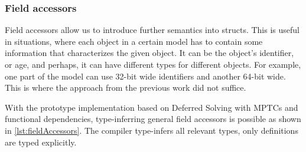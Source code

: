 \subsubsection{Field accessors}

Field accessors allow us to introduce further semantics into structs. This is useful in situations, where each object in a certain model has to contain some information that characterizes the given object. It can be the object's identifier, or age, and perhaps, it can have different types for different objects. For example, one part of the model can use 32-bit wide identifiers and another 64-bit wide. This is where the approach from the previous work did not suffice.

With the prototype implementation based on Deferred Solving with MPTCs and functional dependencies, type-inferring general field accessors is possible as shown in \cref{lst:fieldAccessors}. The compiler type-infers all relevant types, only  definitions are typed explicitly.

